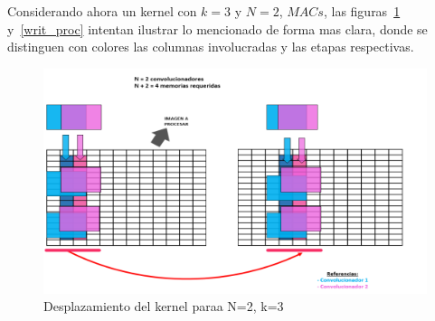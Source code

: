 Considerando ahora un kernel con $k=3$ y  $N=2$, $MACs$, las
figuras~\ref{writingprocess2} y~\ref{writ_proc} intentan ilustrar lo mencionado
de forma mas clara, donde se distinguen con colores las columnas involucradas y
las etapas respectivas.

\begin{figure}
\centering
\includegraphics[scale=0.75]{conv2_despl.png}
\caption{Desplazamiento del kernel paraa N=2, k=3 }
\label{writingprocess2}
\end{figure}




